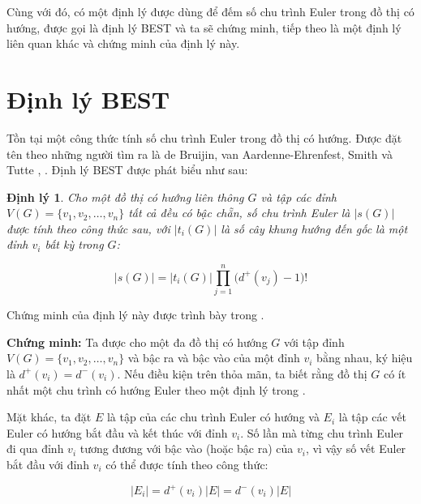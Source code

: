 \documentclass[14pt, a4paper]{article}
\numberwithin{equation}{section}
\numberwithin{figure}{section}
\newtheorem{dl}{Định lý}
\numberwithin{dl}{section}
\numberwithin{md}{section}
\numberwithin{bd}{section}
\numberwithin{dn}{section}
\numberwithin{hq}{section}
\begin{document}
    Cùng với đó, có một định lý được dùng để đếm số chu trình Euler trong đồ thị có hướng, được gọi là định lý BEST và ta sẽ chứng minh, tiếp theo là một định lý liên quan khác và chứng minh của định lý này.

    \section{Định lý BEST}

    Tồn tại một công thức tính số chu trình Euler trong đồ thị có hướng.
    Được đặt tên theo những người tìm ra là de Bruijin, van Aardenne-Ehrenfest, Smith và Tutte \cite{van1951circuits}, \cite{tutte1941unicursal}.
    Định lý BEST được phát biểu như sau:

    \begin{dl}
        Cho một đồ thị có hướng liên thông $G$ và tập các đỉnh $V(G)=\lbrace v_1, v_2, \dots, v_n \rbrace$ tất cả đều có bậc chẵn, số chu trình Euler là $\lvert s(G) \rvert$ được tính theo công thức sau, với $\lvert t_i (G) \rvert$ là số cây khung hướng đến gốc là một đỉnh $v_i$ bất kỳ trong $G$:

        \begin{equation*}
            \lvert s(G) \rvert = \lvert t_i (G) \rvert \prod_{j=1}^n \big( d^+ (v_j) - 1 \big)!
        \end{equation*}
    \end{dl}

    Chứng minh của định lý này được trình bày trong \cite{bollobas1998graduate}.

    \textbf{Chứng minh:}
    Ta được cho một đa đồ thị có hướng $G$ với tập đỉnh $V(G)=\lbrace v_1, v_2, \dots, v_n \rbrace$ và bậc ra và bậc vào của một đỉnh $v_i$ bằng nhau, ký hiệu là $d^+ (v_i) = d^- (v_i)$.
    Nếu điều kiện trên thỏa mãn, ta biết rằng đồ thị $G$ có ít nhất một chu trình có hướng Euler theo một định lý trong \cite{bollobas1998graduate}.

    Mặt khác, ta đặt $E$ là tập của các chu trình Euler có hướng và $E_i$ là tập các vết Euler có hướng bắt đầu và kết thúc với đỉnh $v_i$.
    Số lần mà từng chu trình Euler đi qua đỉnh $v_i$ tương đương với bậc vào (hoặc bậc ra) của $v_i$, vì vậy số vết Euler bắt đầu với đỉnh $v_i$ có thể được tính theo công thức:

    \begin{equation}
        \lvert E_i \rvert = d^+ (v_i) \lvert E \rvert = d^- (v_i) \lvert E \rvert
    \end{equation}
\end{document}
